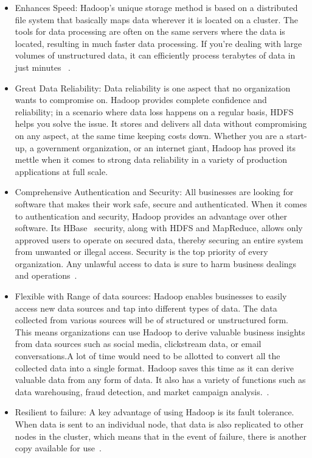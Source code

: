 \begin{itemize}
\item Enhances Speed: 
Hadoop's unique storage method is based on a distributed file system that 
basically maps data wherever it is located on a cluster. The tools for data 
processing are often on the same servers where the data is located, resulting 
in much faster data processing. If you’re dealing with large volumes of 
unstructured data, it can efficiently process terabytes of data in just minutes
~\cite{hid-sp18-406-hadoop-intro10}.


\item Great Data Reliability: 
Data reliability is one aspect that no organization wants to compromise on. 
Hadoop provides complete confidence and reliability; in a scenario where data 
loss happens on a regular basis, HDFS helps you solve the issue. It stores and 
delivers all data without compromising on any aspect, at the same time keeping 
costs down. Whether you are a start-up, a government organization, or an 
internet giant, Hadoop has proved its mettle when it comes to strong data 
reliability in a variety of production applications at full scale.


\item Comprehensive Authentication and Security: 
All businesses are looking for software that makes their work safe, secure and 
authenticated. When it comes to authentication and security, Hadoop provides an 
advantage over other software. Its HBase~\cite{hid-sp18-406-hbase} security, 
along with HDFS and MapReduce, allows only approved users to operate on secured 
data, thereby securing an entire system from unwanted or illegal access. 
Security is the top priority of every organization. Any unlawful access to data 
is sure to harm business dealings and 
operations~\cite{hid-sp18-406-hadoop-intro11}.


\item Flexible with Range of data sources: 
Hadoop enables businesses to easily access new data sources and tap into 
different types of data. The data collected from various sources will be of 
structured or unstructured form. This means organizations can use Hadoop to 
derive valuable business insights from data sources such as social media, 
clickstream data,  or email conversations.A lot of time would need to be 
allotted to convert all the collected data into a single format. Hadoop saves 
this time as it can derive valuable data from any form of data. It also has a 
variety of functions such as data warehousing, fraud detection, and market 
campaign analysis.~\cite{hid-sp18-406-hadoop-intro12}.


\item Resilient to failure: 
A key advantage of using Hadoop is its fault tolerance. When data is sent to an 
individual node, that data is also replicated to other nodes in the cluster, 
which means that in the event of failure, there is another copy available for 
use~\cite{hid-sp18-406-hadoop-intro13}.

\end{itemize}


